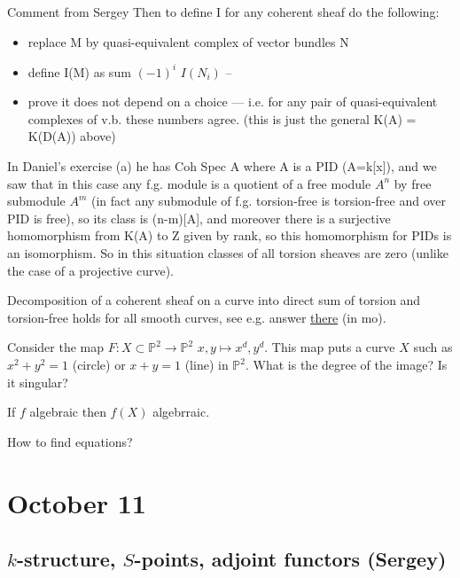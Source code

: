 \begin{thing4}{Comment from Sergey}
Then to define I for any coherent sheaf do the following:
\begin{itemize}
\item  replace M by quasi-equivalent complex of vector bundles N
\item define I(M) as sum $(-1)^i$ $I(N_i)$ --
\item prove it does not depend on a choice — i.e. for any pair of quasi-equivalent complexes of v.b. these numbers agree. (this is just the general K(A) = K(D(A)) above)

\end{itemize}
In Daniel's exercise (a) he has Coh Spec A where A is a PID (A=k[x]), and we saw that in this case any f.g. module is a quotient of a free module $A^n$ by free submodule $A^m$ (in fact any submodule of f.g. torsion-free is torsion-free and over PID is free), so its class is (n-m)[A], and moreover there is a surjective homomorphism from K(A) to Z given by rank, so this homomorphism for PIDs is an isomorphism. So in this situation classes of all torsion sheaves are zero (unlike the case of a projective curve).

Decomposition of a coherent sheaf on a curve into direct sum of torsion and torsion-free holds for all smooth curves, see e.g. answer \href{https://math.stackexchange.com/questions/4183774/coherent-sheaves-on-smooth-curves}{there} (in mo).
\end{thing4}

\begin{exercise}[Sergey]\leavevmode
	Consider the map  $F:X\subset \mathbb{P}^2\longrightarrow \mathbb{P}^2$ $x,y\mapsto x^d,y^d$. This map puts a curve $X$ such as $x^2+y^2=1$ (circle) or $x+y=1$ (line) in $ \mathbb{P}^2$. What is the degree of the image? Is it singular?
\end{exercise}

\begin{claim}[Sergey]\leavevmode
	If $f$ algebraic then $f(X)$ algebrraic.

	How to find equations?
\end{claim}

\section{October 11}

\subsection{$k$-structure, $S$-points, adjoint functors (Sergey)}

